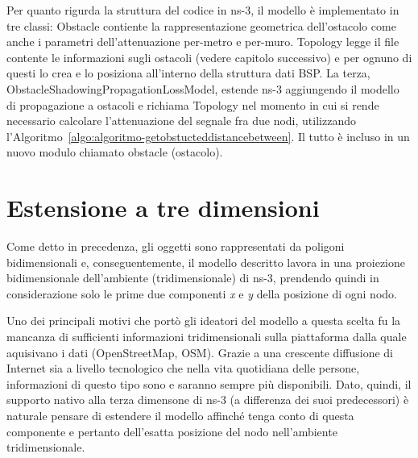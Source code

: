 %
Per quanto rigurda la struttura del codice in ns-3, il modello è implementato in tre classi:
\textsf{Obstacle} contiente la rappresentazione geometrica dell'ostacolo come anche i parametri dell'attenuazione per-metro e per-muro.
\textsf{Topology} legge il file contente le informazioni sugli ostacoli (vedere capitolo successivo) e per ognuno di questi
lo crea e lo posiziona all'interno della struttura dati BSP.
La terza, \textsf{ObstacleShadowingPropagationLossModel}, estende ns-3 aggiungendo il modello di propagazione a ostacoli
e richiama \textsf{Topology} nel momento in cui si rende necessario calcolare l'attenuazione del segnale fra due nodi,
utilizzando l'Algoritmo~\ref{algo:algoritmo-getobstucteddistancebetween}.
Il tutto è incluso in un nuovo modulo chiamato \textsf{obstacle} (ostacolo).
%
\section{Estensione a tre dimensioni}\label{sec:estensione-a-tre-dimensioni}
Come detto in precedenza, gli oggetti sono rappresentati da poligoni bidimensionali e, conseguentemente,
il modello descritto lavora in una proiezione bidimensionale dell'ambiente (tridimensionale) di ns-3,
prendendo quindi in considerazione solo le prime due componenti \textit{x} e \textit{y} della posizione di ogni nodo.

Uno dei principali motivi che portò gli ideatori del modello a questa scelta fu la mancanza di sufficienti informazioni tridimensionali
sulla piattaforma dalla quale aquisivano i dati (OpenStreetMap, OSM).
Grazie a una crescente diffusione di Internet sia a livello tecnologico che nella vita quotidiana delle persone,
informazioni di questo tipo sono e saranno sempre più disponibili.
Dato, quindi, il supporto nativo alla terza dimensone di ns-3 (a differenza dei suoi predecessori)
è naturale pensare di estendere il modello affinché
tenga conto di questa componente e pertanto dell'esatta posizione del nodo nell'ambiente tridimensionale.
%
